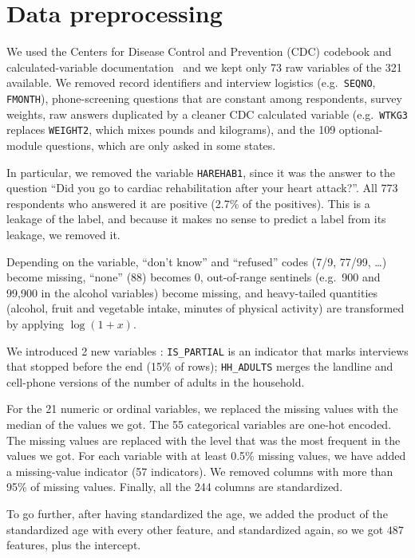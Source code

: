 \documentclass[10pt,conference,compsocconf]{IEEEtran}
\begin{document}
\section{Data preprocessing}
We used the Centers for Disease Control and Prevention (CDC) codebook and calculated-variable documentation~\cite{brfss2015,brfsscv2015} and we kept only 73 raw variables of the 321 available. We removed record identifiers and interview logistics (e.g.\ \texttt{SEQNO}, \texttt{FMONTH}), phone-screening questions that are constant among respondents, survey weights, raw answers duplicated by a cleaner CDC calculated variable (e.g.\ \texttt{WTKG3} replaces \texttt{WEIGHT2}, which mixes pounds and kilograms), and the 109 optional-module questions, which are only asked in some states.

In particular, we removed the variable \texttt{HAREHAB1}, since it was the answer to the question ``Did you go to cardiac rehabilitation after your heart attack?''. All 773 respondents who answered it are positive (2.7\% of the positives). This is a leakage of the label, and because it makes no sense to predict a label from its leakage, we removed it.

Depending on the variable, ``don't know'' and ``refused'' codes (7/9, 77/99, \ldots) become missing, ``none'' (88) becomes 0, out-of-range sentinels (e.g.\ 900 and 99{,}900 in the alcohol variables) become missing, and heavy-tailed quantities (alcohol, fruit and vegetable intake, minutes of physical activity) are transformed by applying $\log(1+x)$.

We introduced 2 new variables : \texttt{IS\_PARTIAL} is an indicator that marks interviews that stopped before the end (15\% of rows); \texttt{HH\_ADULTS} merges the landline and cell-phone versions of the number of adults in the household.

For the 21 numeric or ordinal variables, we replaced the missing values with the median of the values we got. The 55 categorical variables are one-hot encoded. The missing values are replaced with the level that was the most frequent in the values we got. For each variable with at least 0.5\% missing values, we have added a missing-value indicator (57 indicators). We removed columns with more than 95\% of missing values. Finally, all the 244 columns are standardized.

To go further, after having standardized the age, we added the product of the standardized age with every other feature, and standardized again, so we got $487$ features, plus the intercept.
\end{document}
